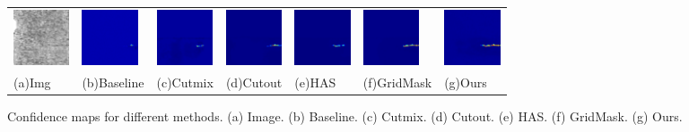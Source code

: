 \documentclass[sn-mathphys]{sn-jnl}%
\theoremstyle{thmstyleone}%
\theoremstyle{thmstyletwo}%
\theoremstyle{thmstylethree}%
\begin{document}
\begin{figure}
{\begin{tabular}{p{1.5cm}p{1.5cm}p{1.5cm}p{1.5cm}p{1.5cm}p{1.5cm}p{1.5cm}}
    \includegraphics[width=0.65in]{fig11-2-input.png}& 
    \includegraphics[width=0.65in]{fig11-2-ori.png}& 
    \includegraphics[width=0.65in]{fig11-2-cutmix.png}& 
    \includegraphics[width=0.65in]{fig11-2-cutout.png}& 
    \includegraphics[width=0.65in]{fig11-2-has.png}& 
    \includegraphics[width=0.65in]{fig11-2-gridmask.png}& 
    \includegraphics[width=0.65in]{fig11-2-ours.png} \\

\centering\footnotesize(a)Img& \centering\footnotesize(b)Baseline& \centering\footnotesize(c)Cutmix& \centering\footnotesize(d)Cutout& \centering\footnotesize(e)HAS& \centering\footnotesize(f)GridMask & \centering\footnotesize(g)Ours\\
\end{tabular}}
	\centering
	\caption{Confidence maps for different methods. (a) Image. (b) Baseline. (c) Cutmix. (d) Cutout. (e) HAS. (f) GridMask. (g) Ours.  }
	\label{fig:4.3.KSD-cm}
\end{figure}
\end{document}
